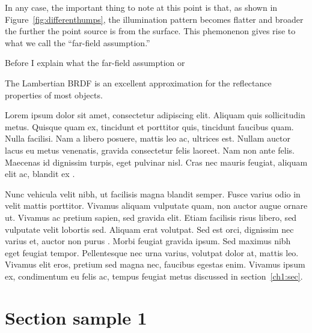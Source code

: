 In any case, the important thing to note at this point is that, as shown in Figure~\ref{fig:differenthumps}, the illumination pattern becomes flatter and broader the further the point source is from the surface. This phemonenon gives rise to what we call the ``far-field assumption.''


    
    
    
    
    
    
    

    Before I explain what the far-field assumption or 
    
    
    
    






    





The Lambertian BRDF is an excellent approximation for the reflectance properties of most objects.









Lorem ipsum dolor sit amet, consectetur adipiscing elit. Aliquam quis sollicitudin metus. Quisque quam ex, tincidunt et porttitor quis, tincidunt faucibus quam. Nulla facilisi. Nam a libero posuere, mattis leo ac, ultrices est. Nullam auctor lacus eu metus venenatis, gravida consectetur felis laoreet. Nam non ante felis. Maecenas id dignissim turpis, eget pulvinar nisl. Cras nec mauris feugiat, aliquam elit ac, blandit ex \cite{article-full}.

Nunc vehicula velit nibh, ut facilisis magna blandit semper. Fusce varius odio in velit mattis porttitor. Vivamus aliquam vulputate quam, non auctor augue ornare ut. Vivamus ac pretium sapien, sed gravida elit. Etiam facilisis risus libero, sed vulputate velit lobortis sed. Aliquam erat volutpat. Sed est orci, dignissim nec varius et, auctor non purus \cite{proceedings-minimal,phdthesis-full}. Morbi feugiat gravida ipsum. Sed maximus nibh eget feugiat tempor. Pellentesque nec urna varius, volutpat dolor at, mattis leo. Vivamus elit eros, pretium sed magna nec, faucibus egestas enim. Vivamus ipsum ex, condimentum eu felis ac, tempus feugiat metus discussed in section~\ref{ch1:sec}.

\section{Section sample 1}

